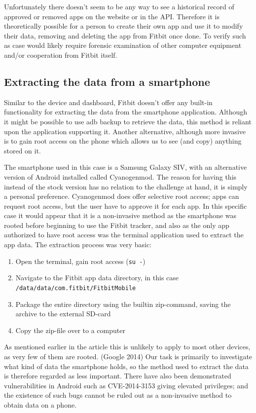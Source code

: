 \documentclass[a4paper,11pt,dvips]{article}
\begin{document}
Unfortunately there doesn't seem to be any way to see a historical record of approved or removed apps on the website or in the API. Therefore it is theoretically possible for a person to create their own app and use it to modify their data, removing and deleting the app from Fitbit once done. To verify such as case would likely require forensic examination of other computer equipment and/or cooperation from Fitbit itself.


\subsection{Extracting the data from a smartphone}

Similar to the device and dashboard, Fitbit doesn't offer any built-in functionality for extracting the data from the smartphone application. Although it might be possible to use adb backup to retrieve the data, this method is reliant upon the application supporting it. Another alternative, although more invasive is to gain root access on the phone which allows us to see (and copy) anything stored on it.

The smartphone used in this case is a Samsung Galaxy SIV, with an alternative version of Android installed called Cyanogenmod. The reason for having this instead of the stock version has no relation to the challenge at hand, it is simply a personal preference. Cyanogenmod does offer selective root access; apps can request root access, but the user have to approve it for each app. In this specific case it would appear that it is a non-invasive method as the smartphone was rooted before beginning to use the Fitbit tracker, and also as the only app authorized to have root access was the terminal application used to extract the app data. The extraction process was very basic:

\begin{enumerate}
\item Open the terminal, gain root access (\texttt{su -})
\item Navigate to the Fitbit app data directory, in this case \\ \texttt{/data/data/com.fitbit/FitbitMobile}
\item Package the entire directory using the builtin zip-command, saving the archive to the external SD-card
\item Copy the zip-file over to a computer
\end{enumerate}

\noindent
As mentioned earlier in the article this is unlikely to apply to most other devices, as very few of them are rooted. (Google 2014) Our task is primarily to investigate what kind of data the smartphone holds, so the method used to extract the data is therefore regarded as less important. There have also been demonstrated vulnerabilities in Android such as CVE-2014-3153 giving elevated privileges; and the existence of such bugs cannot be ruled out as a non-invasive method to obtain data on a phone.
\end{document}
